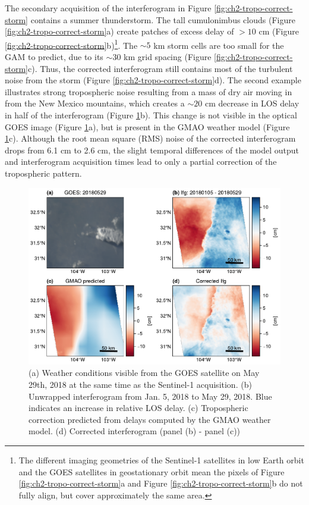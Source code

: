 The secondary acquisition of the interferogram in Figure \ref{fig:ch2-tropo-correct-storm} contains a summer thunderstorm. The tall cumulonimbus clouds (Figure \ref{fig:ch2-tropo-correct-storm}a) create patches of excess delay of $>10$ cm (Figure \ref{fig:ch2-tropo-correct-storm}b)\footnote{The different imaging geometries of the Sentinel-1 satellites in low Earth orbit and the GOES satellites in geostationary orbit mean the pixels of Figure \ref{fig:ch2-tropo-correct-storm}a and Figure \ref{fig:ch2-tropo-correct-storm}b do not fully align, but cover approximately the same area.}.
The $\sim 5$ km storm cells are too small for the GAM to predict, due to its $\sim30$ km grid spacing (Figure \ref{fig:ch2-tropo-correct-storm}c). Thus, the corrected interferogram still contains most of the turbulent noise from the storm (Figure \ref{fig:ch2-tropo-correct-storm}d).
The second example illustrates strong tropospheric noise resulting from a mass of dry air moving in from the New Mexico mountains, which creates a $\sim 20$ cm decrease in LOS delay in half of the interferogram (Figure \ref{fig:ch2-tropo-correct-wave}b). This change is not visible in the optical GOES image (Figure \ref{fig:ch2-tropo-correct-wave}a), but is present in the GMAO weather model (Figure \ref{fig:ch2-tropo-correct-wave}c). Although the root mean square (RMS) noise of the corrected interferogram drops from 6.1 cm to 2.6 cm, the slight temporal differences of the model output and interferogram acquisition times lead to only a partial correction of the tropospheric pattern.



\begin{figure}
	\centering
	\includegraphics[width=1.0\textwidth]{figures/chapter2-sar/figure_tropo_correct_wave.pdf}
	\caption[West Texas tropospheric correction attempt for pressure front]{
		(a) Weather conditions visible from the GOES satellite on May 29th, 2018 at the same time as the Sentinel-1 acquisition.
		(b) Unwrapped interferogram from Jan. 5, 2018 to May 29, 2018. Blue indicates an increase in relative LOS delay.
		(c) Tropospheric correction predicted from delays computed by the GMAO weather model.
		(d) Corrected interferogram (panel (b) - panel (c))
	}
	\label{fig:ch2-tropo-correct-wave}
\end{figure}


